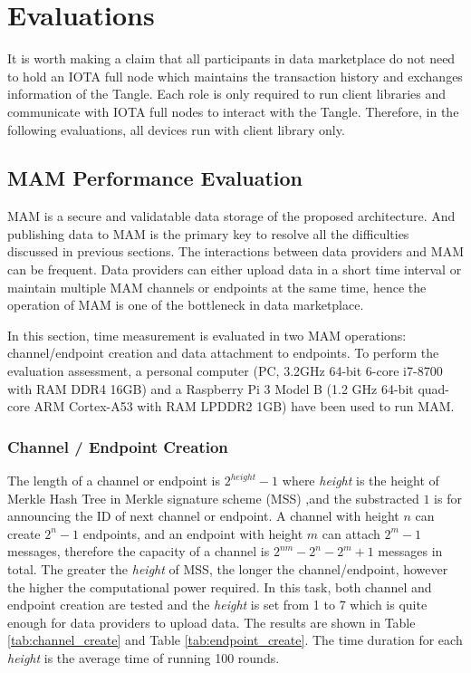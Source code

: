 \documentclass[journal,article,applsci,submit,moreauthors,pdftex]{Definitions/mdpi}
\begin{document}
\section{Evaluations}
It is worth making a claim that all participants in data marketplace do not need to hold an IOTA full node which maintains the transaction history and exchanges information of the Tangle. Each role is only required to run client libraries and communicate with IOTA full nodes to interact with the Tangle. Therefore, in the following evaluations, all devices run with client library only.

\subsection{MAM Performance Evaluation}
MAM is a secure and validatable data storage of the proposed architecture. And publishing data to MAM is the primary key to resolve all the difficulties discussed in previous sections. The interactions between data providers and MAM can be frequent. Data providers can either upload data in a short time interval or maintain multiple MAM channels or endpoints at the same time, hence the operation of MAM is one of the bottleneck in data marketplace.

In this section, time measurement is evaluated in two MAM operations: channel/endpoint creation and data attachment to endpoints. To perform the evaluation assessment, a personal computer (PC, 3.2GHz 64-bit 6-core i7-8700 with RAM DDR4 16GB) and a Raspberry Pi 3 Model B (1.2 GHz 64-bit quad-core ARM Cortex-A53 with RAM LPDDR2 1GB) have been used to run MAM. 

\subsubsection{Channel / Endpoint Creation}
The length of a channel or endpoint is $2^{height}-1$ where \textit{height} is the height of Merkle Hash Tree in Merkle signature scheme (MSS) ,and the substracted $1$ is for announcing the ID of next channel or endpoint. A channel with height $n$ can create $2^n-1$ endpoints, and an endpoint with height $m$ can attach $2^m-1$ messages, therefore the capacity of a channel is $2^{nm}-2^n-2^m+1$ messages in total. The greater the \textit{height} of MSS, the longer the channel/endpoint, however the higher the computational power required. In this task, both channel and endpoint creation are tested and the \textit{height} is set from 1 to 7 which is quite enough for data providers to upload data. The results are shown in Table \ref{tab:channel_create} and Table \ref{tab:endpoint_create}. The time duration for each \textit{height} is the average time of running 100 rounds.
\end{document}
